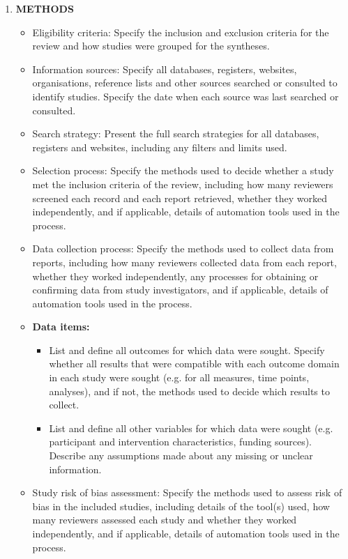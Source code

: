 \documentclass{article}
\begin{document}
\begin{enumerate}
    \item \textbf{METHODS}
    \begin{itemize}
        \item[5.] Eligibility criteria: Specify the inclusion and exclusion criteria for the review and how studies were grouped for the syntheses.
        \item[6.] Information sources: Specify all databases, registers, websites, organisations, reference lists and other sources searched or consulted to identify studies. Specify the date when each source was last searched or consulted.
        \item[7.] Search strategy: Present the full search strategies for all databases, registers and websites, including any filters and limits used.
        \item[8.] Selection process: Specify the methods used to decide whether a study met the inclusion criteria of the review, including how many reviewers screened each record and each report retrieved, whether they worked independently, and if applicable, details of automation tools used in the process.
        \item[9.] Data collection process: Specify the methods used to collect data from reports, including how many reviewers collected data from each report, whether they worked independently, any processes for obtaining or confirming data from study investigators, and if applicable, details of automation tools used in the process.
        \item[10] \textbf{Data items:}
        \begin{itemize}
            \item[10a.] List and define all outcomes for which data were sought. Specify whether all results that were compatible with each outcome domain in each study were sought (e.g. for all measures, time points, analyses), and if not, the methods used to decide which results to collect.
            \item[10b.] List and define all other variables for which data were sought (e.g. participant and intervention characteristics, funding sources). Describe any assumptions made about any missing or unclear information.
        \end{itemize}
        \item[11.] Study risk of bias assessment: Specify the methods used to assess risk of bias in the included studies, including details of the tool(s) used, how many reviewers assessed each study and whether they worked independently, and if applicable, details of automation tools used in the process.

\end{itemize}
\end{enumerate}
\end{document}
